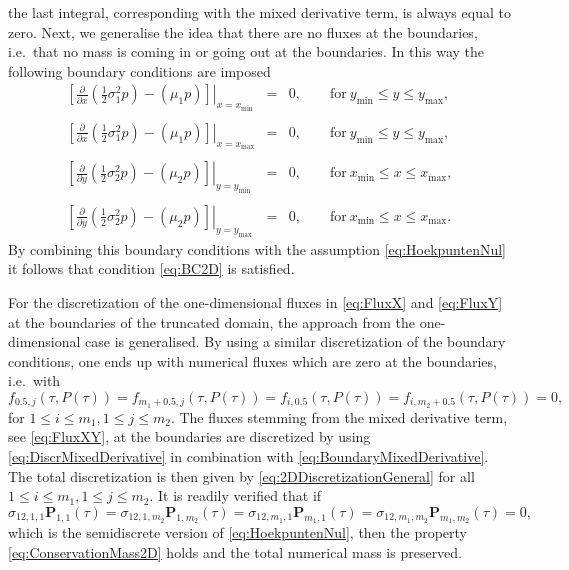 \documentclass[10pt]{article}
\begin{document}
the last integral, corresponding with the mixed derivative term, is always equal to zero.
Next, we generalise the idea that there are no fluxes at the boundaries, i.e.\ that no mass is coming in or going out at the boundaries.
In this way the following boundary conditions are imposed
\begin{eqnarray*}
\left. \left[ \tfrac{\partial}{\partial x} \left( \tfrac{1}{2} \sigma_{1}^{2}p \right) - \left( \mu_{1} p \right) \right]\right\vert_{x=x_{\min}} &=& 0, \qquad \mathrm{for} \ y_{\min} \le y \le y_{\max}, \\\\
\left. \left[ \tfrac{\partial}{\partial x} \left( \tfrac{1}{2} \sigma_{1}^{2}p \right) - \left( \mu_{1} p \right) \right]\right\vert_{x=x_{\max}} &=& 0, \qquad \mathrm{for} \ y_{\min} \le y \le y_{\max}, \\\\
\left. \left[ \tfrac{\partial}{\partial y} \left( \tfrac{1}{2} \sigma_{2}^{2}p \right) - \left( \mu_{2} p \right) \right]\right\vert_{y=y_{\min}} &=& 0, \qquad \mathrm{for} \ x_{\min} \le x \le x_{\max}, \\\\
\left. \left[ \tfrac{\partial}{\partial y} \left( \tfrac{1}{2} \sigma_{2}^{2}p \right) - \left( \mu_{2} p \right) \right]\right\vert_{y=y_{\max}} &=& 0, \qquad \mathrm{for} \ x_{\min} \le x \le x_{\max}.
\end{eqnarray*}
By combining this boundary conditions with the assumption \eqref{eq:HoekpuntenNul} it follows that condition \eqref{eq:BC2D} is satisfied.

For the discretization of the one-dimensional fluxes in \eqref{eq:FluxX} and \eqref{eq:FluxY} at the boundaries of the truncated domain, the approach from the one-dimensional case is generalised. By using a similar discretization of the boundary conditions, one ends up with numerical fluxes which are zero at the boundaries, i.e.\ with
$$ f_{0.5,j}(\tau,P(\tau)) = f_{m_{1}+0.5,j}(\tau,P(\tau)) = f_{i,0.5}(\tau,P(\tau)) = f_{i,m_{2} + 0.5}(\tau,P(\tau)) = 0, $$
for $1 \leq i \le m_{1}, 1 \le j \le m_{2}$.
The fluxes stemming from the mixed derivative term, see \eqref{eq:FluxXY}, at the boundaries are discretized by using \eqref{eq:DiscrMixedDerivative} in combination with \eqref{eq:BoundaryMixedDerivative}. 
The total discretization is then given by \eqref{eq:2DDiscretizationGeneral} for all $1 \le i \le m_{1}, 1 \le j \le m_{2}$.
It is readily verified that if
$$ \sigma_{12,1,1} \boldsymbol{P}_{1,1}(\tau) = \sigma_{12,1,m_{2}} \boldsymbol{P}_{1,m_{2}}(\tau) = \sigma_{12,m_{1},1} \boldsymbol{P}_{m_{1},1}(\tau) = \sigma_{12,m_{1},m_{2}} \boldsymbol{P}_{m_{1},m_{2}}(\tau)=0, $$
which is the semidiscrete version of \eqref{eq:HoekpuntenNul}, then the property \eqref{eq:ConservationMass2D} holds and the total numerical mass is preserved.
\end{document}
